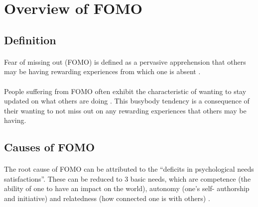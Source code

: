 \section{Overview of FOMO}
  \subsection{Definition}
    \paragraph{}
      Fear of missing out (FOMO) is defined as a pervasive apprehension that others may be having rewarding experiences from which one is absent \cite{przybylski2013motivational}.
    \paragraph{}
      People suffering from FOMO often exhibit the characteristic of wanting to stay updated on what others are doing \cite{przybylski2013motivational}. This busybody tendency is a consequence of their wanting to not miss out on any rewarding experiences that others may be having.
  \subsection{Causes of FOMO}
    \paragraph{}
      The root cause of FOMO can be attributed to the “deficits in psychological needs satisfactions”. These can be reduced to 3 basic needs, which are competence (the ability of one to have an impact on the world), autonomy (one’s self- authorship and initiative) and relatedness (how connected one is with others) \cite{przybylski2013motivational}.
